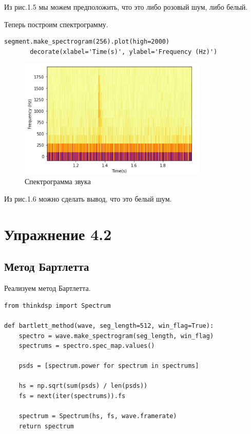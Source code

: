 \documentclass[a4paper,12pt]{report}
\begin{document}
    Из рис.1.5 мы можем предположить, что это либо розовый шум, либо белый.
    
    Теперь построим спектрограмму.
\begin{lstlisting}[caption=Получение спектрограммы]
       segment.make_spectrogram(256).plot(high=2000)
       decorate(xlabel='Time(s)', ylabel='Frequency (Hz)')
\end{lstlisting}
\begin{figure}[H]
        \centering
        \includegraphics[width=0.8\textwidth]{fig1-6.PNG}
        \caption{Спектрограмма звука}
        \label{fig:fig1-6}
\end{figure}

    Из рис.1.6 можно сделать вывод, что это белый шум.
    
\chapter{Упражнение 4.2}
\section{Метод Бартлетта}
    Реализуем метод Бартлетта.
\begin{lstlisting}[caption=Метод Бартлетта]
from thinkdsp import Spectrum

def bartlett_method(wave, seg_length=512, win_flag=True):
    spectro = wave.make_spectrogram(seg_length, win_flag)
    spectrums = spectro.spec_map.values()
    
    psds = [spectrum.power for spectrum in spectrums]
    
    hs = np.sqrt(sum(psds) / len(psds))
    fs = next(iter(spectrums)).fs
    
    spectrum = Spectrum(hs, fs, wave.framerate)
    return spectrum
\end{lstlisting}
\end{document}
